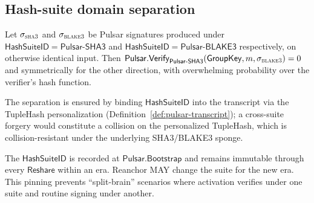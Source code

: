 
\subsection*{Hash-suite domain separation}

\begin{theorem}
\label{thm:hash-suite-separation}
Let $\sigma_{\textsc{sha3}}$ and $\sigma_{\textsc{blake3}}$ be Pulsar
signatures produced under
$\mathsf{HashSuiteID} = \mathsf{Pulsar\text{-}SHA3}$ and
$\mathsf{HashSuiteID} = \mathsf{Pulsar\text{-}BLAKE3}$ respectively,
on otherwise identical input. Then
$\mathsf{Pulsar.Verify}_{\mathsf{Pulsar\text{-}SHA3}}(
\mathsf{GroupKey}, m, \sigma_{\textsc{blake3}}) = 0$
and symmetrically for the other direction, with overwhelming
probability over the verifier's hash function.

The separation is ensured by binding $\mathsf{HashSuiteID}$ into
the transcript via the TupleHash personalization
(Definition~\ref{def:pulsar-transcript}); a cross-suite forgery
would constitute a collision on the personalized TupleHash, which is
collision-resistant under the underlying SHA3/BLAKE3 sponge.
\end{theorem}

\begin{remark}
The $\mathsf{HashSuiteID}$ is recorded at $\mathsf{Pulsar.Bootstrap}$
and remains immutable through every $\mathsf{Reshare}$ within an era.
Reanchor MAY change the suite for the new era. This pinning prevents
``split-brain'' scenarios where activation verifies under one suite
and routine signing under another.
\end{remark}
